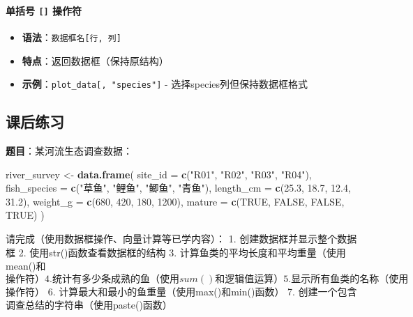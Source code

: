 \documentclass[
]{book}
\newenvironment{Shaded}{\begin{snugshade}}{\end{snugshade}}
\newcommand{\AttributeTok}[1]{\textcolor[rgb]{0.13,0.29,0.53}{#1}}
\newcommand{\ConstantTok}[1]{\textcolor[rgb]{0.56,0.35,0.01}{#1}}
\newcommand{\DecValTok}[1]{\textcolor[rgb]{0.00,0.00,0.81}{#1}}
\newcommand{\FloatTok}[1]{\textcolor[rgb]{0.00,0.00,0.81}{#1}}
\newcommand{\FunctionTok}[1]{\textcolor[rgb]{0.13,0.29,0.53}{\textbf{#1}}}
\newcommand{\NormalTok}[1]{#1}
\newcommand{\OtherTok}[1]{\textcolor[rgb]{0.56,0.35,0.01}{#1}}
\newcommand{\StringTok}[1]{\textcolor[rgb]{0.31,0.60,0.02}{#1}}
\providecommand{\tightlist}{%
  \setlength{\itemsep}{0pt}\setlength{\parskip}{0pt}}
\begin{document}
\hypertarget{ux5355ux62ecux53f7-ux64cdux4f5cux7b26}{%
\paragraph{\texorpdfstring{单括号 \texttt{{[}{]}} 操作符}{单括号 {[}{]} 操作符}}\label{ux5355ux62ecux53f7-ux64cdux4f5cux7b26}}

\begin{itemize}
\tightlist
\item
  \textbf{语法}：\texttt{数据框名{[}行,\ 列{]}}
\item
  \textbf{特点}：返回数据框（保持原结构）
\item
  \textbf{示例}：\texttt{plot\_data{[},\ "species"{]}} - 选择species列但保持数据框格式
\end{itemize}

\hypertarget{ux8bfeux540eux7ec3ux4e60-2}{%
\subsection{课后练习}\label{ux8bfeux540eux7ec3ux4e60-2}}

\textbf{题目}：某河流生态调查数据：

\begin{Shaded}
\begin{Highlighting}[]
\NormalTok{river\_survey }\OtherTok{\textless{}{-}} \FunctionTok{data.frame}\NormalTok{(}
  \AttributeTok{site\_id =} \FunctionTok{c}\NormalTok{(}\StringTok{"R01"}\NormalTok{, }\StringTok{"R02"}\NormalTok{, }\StringTok{"R03"}\NormalTok{, }\StringTok{"R04"}\NormalTok{),}
  \AttributeTok{fish\_species =} \FunctionTok{c}\NormalTok{(}\StringTok{"草鱼"}\NormalTok{, }\StringTok{"鲤鱼"}\NormalTok{, }\StringTok{"鲫鱼"}\NormalTok{, }\StringTok{"青鱼"}\NormalTok{),}
  \AttributeTok{length\_cm =} \FunctionTok{c}\NormalTok{(}\FloatTok{25.3}\NormalTok{, }\FloatTok{18.7}\NormalTok{, }\FloatTok{12.4}\NormalTok{, }\FloatTok{31.2}\NormalTok{),}
  \AttributeTok{weight\_g =} \FunctionTok{c}\NormalTok{(}\DecValTok{680}\NormalTok{, }\DecValTok{420}\NormalTok{, }\DecValTok{180}\NormalTok{, }\DecValTok{1200}\NormalTok{),}
  \AttributeTok{mature =} \FunctionTok{c}\NormalTok{(}\ConstantTok{TRUE}\NormalTok{, }\ConstantTok{FALSE}\NormalTok{, }\ConstantTok{FALSE}\NormalTok{, }\ConstantTok{TRUE}\NormalTok{)}
\NormalTok{)}
\end{Highlighting}
\end{Shaded}

请完成（使用数据框操作、向量计算等已学内容）：
1. 创建数据框并显示整个数据框
2. 使用str()函数查看数据框的结构
3. 计算鱼类的平均长度和平均重量（使用mean()和\(操作符） 4. 统计有多少条成熟的鱼（使用sum()和逻辑值运算） 5. 显示所有鱼类的名称（使用\)操作符）
6. 计算最大和最小的鱼重量（使用max()和min()函数）
7. 创建一个包含调查总结的字符串（使用paste()函数）
\end{document}
